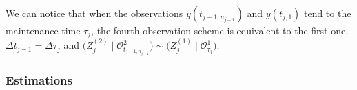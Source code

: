 %
%
%
%
%
%

We can notice that when the observations  $ y(t_{j-1,n_{j-1}})$ and $y(t_{j,1})$ tend to the maintenance time $\tau_j$, the fourth observation scheme is equivalent to the first one,  
 $  \Delta \tilde t_{j-1}=\Delta \tau_j$ and $\big(Z_j^{(2)} \mid \mathcal{O}^2_{t_{j-1,n_{j-1}}} \big )\sim  \big(Z_j^{(1)} \mid \mathcal{O}^1_{\tau_j}\big ) $.\\
 
 
 
 \subsubsection{Estimations}
 
